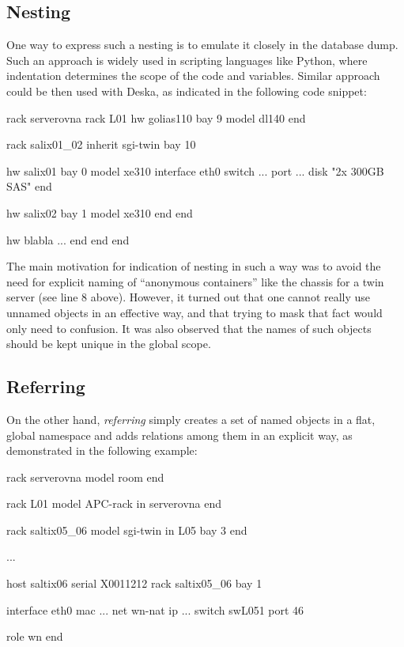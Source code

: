 \documentclass[12pt]{article}
\begin{document}
\subsection{Nesting}

One way to express such a nesting is to emulate it closely in the database dump.
Such an approach is widely used in scripting languages like Python, where
indentation determines the scope of the code and variables.  Similar approach
could be then used with Deska, as indicated in the following code snippet:

\begin{listing}{1}
rack serverovna
    rack L01
        hw golias110
            bay 9
            model dl140
        end

        rack salix01_02
            inherit sgi-twin
            bay 10

            hw salix01
                bay 0
                model xe310
                interface eth0 switch ... port ...
                disk "2x 300GB SAS"
            end

            hw salix02
                bay 1
                model xe310
            end
        end

        hw blabla
            ...
        end
    end
end
\end{listing}

The main motivation for indication of nesting in such a way was to avoid the
need for explicit naming of ``anonymous containers'' like the chassis for a twin
server (see line 8 above).  However, it turned out that one cannot really use
unnamed objects in an effective way, and that trying to mask that fact would
only need to confusion.  It was also observed that the names of such objects
should be kept unique in the global scope.

\subsection{Referring}

On the other hand, {\em referring} simply creates a set of named objects in a
flat, global namespace and adds relations among them in an explicit way, as
demonstrated in the following example:

\begin{listing}{1}
rack serverovna
    model room
end

rack L01
    model APC-rack
    in serverovna
end

rack saltix05_06
    model sgi-twin
    in L05 bay 3
end

...

host saltix06
    serial X0011212
    rack saltix05_06 bay 1

    interface eth0 mac ... net wn-nat ip ... switch swL051 port 46

    role wn
end
\end{listing}
\end{document}
